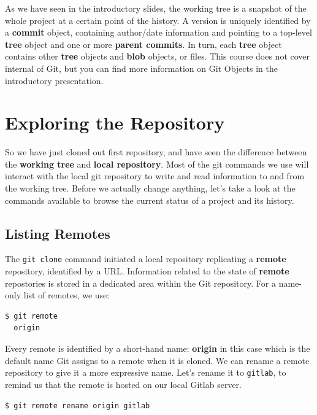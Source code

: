 \documentclass{tufte-handout}
\begin{document}
As we have seen in the introductory slides, the working tree is a snapshot of the whole project at a certain point of the history.
A version is uniquely identified by a \textbf{commit} object, containing author/date information and pointing to a top-level \textbf{tree} object and one or more \textbf{parent commits}.
In turn, each \textbf{tree} object contains other \textbf{tree} objects and \textbf{blob} objects, or files.
This course does not cover internal of Git, but you can find more information on Git Objects in the introductory presentation.

\section{Exploring the Repository}

So we have just cloned out first repository, and have seen the difference between the \textbf{working tree} and \textbf{local repository}.
Most of the git commands we use will interact with the local git repository to write and read information to and from the working tree.
Before we actually change anything, let's take a look at the commands available to browse the current status of a project and its history.

\subsection{Listing Remotes}

The \texttt{git clone} command initiated a local repository replicating a \textbf{remote} repository, identified by a URL.
Information related to the state of \textbf{remote} repostories is stored in a dedicated area within the Git repository.
For a name-only list of remotes, we use:

\begin{lstlisting}[style=BashInputStyle]
  $ git remote
  origin
\end{lstlisting}

Every remote is identified by a short-hand name: \textbf{origin} in this case which is the default name Git assigns to a remote when it is cloned.
We can rename a remote repository to give it a more expressive name.
Let's rename it to \texttt{gitlab}, to remind us that the remote is hosted on our local Gitlab server.

\begin{lstlisting}[style=BashInputStyle]
  $ git remote rename origin gitlab
\end{lstlisting}
\end{document}
